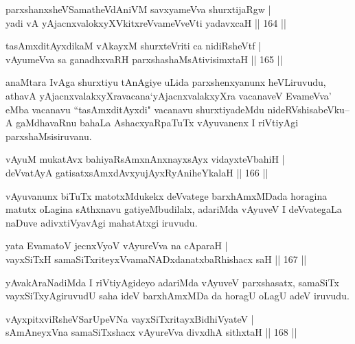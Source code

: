 \begin{shl}
parxshanxsheVSamatheVdAniVM savxyameVva shurxtijaRgw |\\
yadi vA yAjacnxvalokxyXVkitxreVvameVveVti yadavxcaH \hfill || 164 ||
\end{shl}

\begin{shl}
tasAmxditAyxdikaM vAkayxM shurxteVriti ca nidiRsheVtf |\\
vAyumeVva sa ganadhxvaRH parxshashaMsAtivisimxtaH \hfill || 165 ||
\end{shl}

\begin{artha}
anaMtara IvAga shurxtiyu tAnAgiye uLida parxshenxyanunx heVLiruvudu, athavA yAjacnxvalakxyXravacana`yAjacnxvalakxyXra vacanaveV EvameVva' eMba vacanavu ``tasAmxditAyxdi" vacanavu shurxtiyadeMdu nideRVshisabeVku--A gaMdhavaRnu bahaLa AshacxyaRpaTuTx vAyuvanenx I riVtiyAgi parxshaMsisiruvanu.
\end{artha}


\begin{shl}
vAyuM mukatAvx bahiyaRsAmxnAnxnayxsAyx vidayxteV\s bahiH |\\
deVvatAyA gatisatxsAmxdAvxyujAyxRyAniheYkalaH \hfill || 166 ||
\end{shl}

\begin{artha}
vAyuvanunx biTuTx matotxMdukekx deVvatege barxhAmxMDada horagina matutx oLagina sAthxnavu gatiyeMbudilalx, adariMda vAyuveV I deVvategaLa naDuve adivxtiVyavAgi mahatAtxgi iruvudu.
\end{artha}

\begin{shl}
yata EvamatoV jecnxVyoV vAyureVva na cAparaH |\\
vayxSiTxH samaSiTxriteyxVvamaNADxdanatxbaRhishacx saH \hfill || 167 ||
\end{shl}

\begin{artha}
yAvakAraNadiMda I riVtiyAgideyo adariMda vAyuveV parxshasatx, samaSiTx vayxSiTxyAgiruvudU saha ideV barxhAmxMDa da horagU oLagU adeV iruvudu.
\end{artha}


\begin{shl}
vAyxpitxviRsheVSarUpeVNa vayxSiTxritayxBidhiVyateV |\\
sAmAneyxVna samaSiTxshacx vAyureVva divxdhA sithxtaH \hfill || 168 ||
\end{shl}

